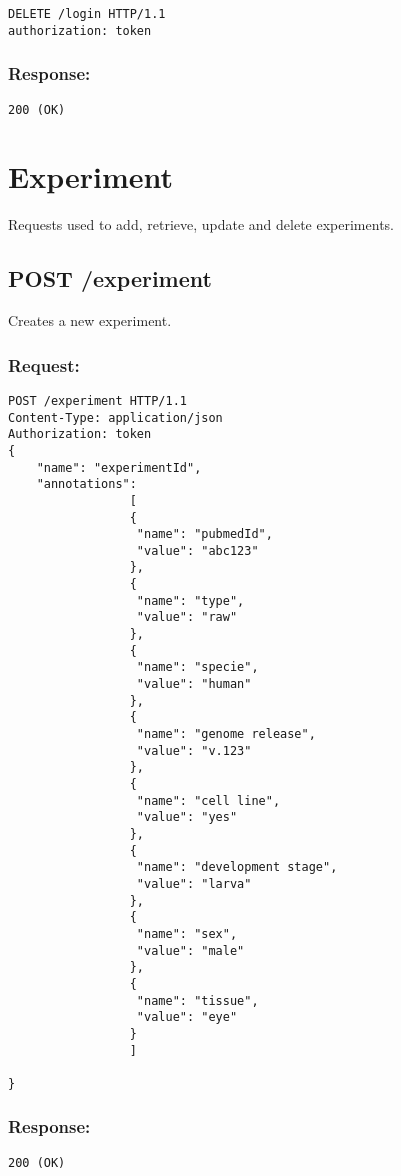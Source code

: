 \begin{verbatim}
DELETE /login HTTP/1.1
authorization: token
\end{verbatim}
\subsubsection*{Response:}

\begin{verbatim}
200 (OK)
\end{verbatim}

\section*{Experiment}
Requests used to add, retrieve, update and delete experiments.

\subsection*{POST /experiment}

Creates a new experiment.

\subsubsection*{Request:}
\begin{verbatim}
POST /experiment HTTP/1.1
Content-Type: application/json
Authorization: token
{
    "name": "experimentId",
    "annotations": 
                 [
                 {
                  "name": "pubmedId",
                  "value": "abc123"
                 }, 
                 {
                  "name": "type",
                  "value": "raw"
                 },
                 {
                  "name": "specie",
                  "value": "human"
                 },
                 {
                  "name": "genome release",
                  "value": "v.123"
                 },
                 {
                  "name": "cell line",
                  "value": "yes"
                 },
                 {
                  "name": "development stage",
                  "value": "larva"
                 },
                 {
                  "name": "sex",
                  "value": "male"
                 },
                 {
                  "name": "tissue",
                  "value": "eye"
                 }
                 ]

}
\end{verbatim}

\subsubsection*{Response:}
\begin{verbatim}
200 (OK)
\end{verbatim}	

